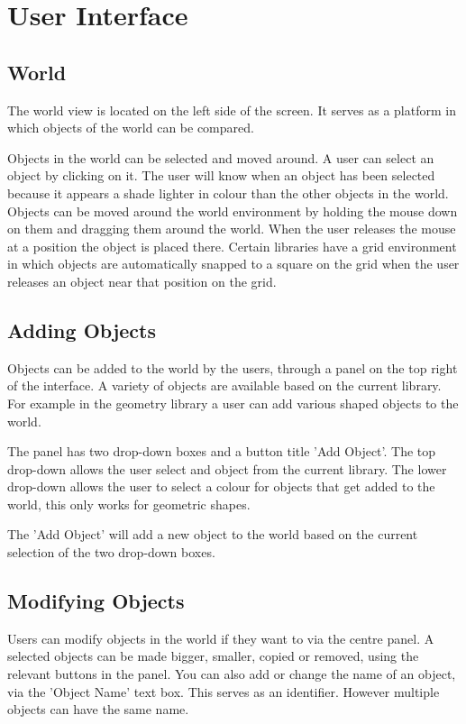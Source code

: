 \documentclass{article}
\begin{document}
	\section{User Interface}
	
	\subsection{World}	
	
	The world view is located on the left side of the screen. It serves as a platform in which objects of the world can be compared. 
	
	Objects in the world can be selected and moved around. A user can select an object by clicking on it. The user will know when an object has been selected because it appears a shade lighter in colour than the other objects in the world. Objects can be moved around the world environment by holding the mouse down on them and dragging them around the world. When the user releases the mouse at a position the object is placed there. Certain libraries have a grid environment in which objects are automatically snapped to a square on the grid when the user releases an object near that position on the grid.
	
	\subsection{Adding Objects}
	
	Objects can be added to the world by the users, through a panel on the top right of the interface. A variety of objects are available based on the current library. For example in the geometry library a user can add various shaped objects to the world.
	
	The panel has two drop-down boxes and a button title 'Add Object'. The top drop-down allows the user select and object from the current library. The lower drop-down allows the user to select a colour for objects that get added to the world, this only works for geometric shapes.
	
	The 'Add Object' will add a new object to the world based on the current selection of the two drop-down boxes.
	
	\subsection{Modifying Objects}
	
	Users can modify objects in the world if they want to via the centre panel. A selected objects can be made bigger, smaller, copied or removed, using the relevant buttons in the panel.
	You can also add or change the name of an object, via the 'Object Name' text box. This serves as an identifier. However multiple objects can have the same name.
	
\end{document}
